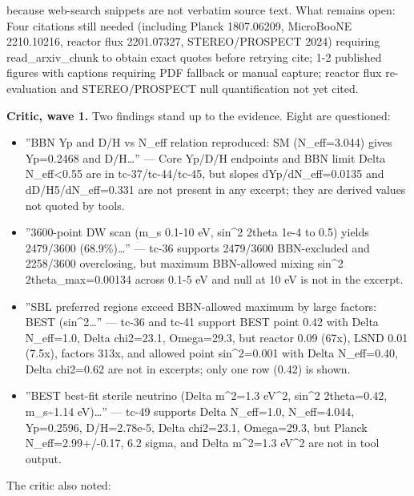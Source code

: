 \documentclass[11pt,a4paper]{article}
\begin{document}
because web-search snippets are not verbatim source text. What remains open: Four citations still needed (including Planck 1807.06209, MicroBooNE 2210.10216, reactor flux 2201.07327, STEREO/PROSPECT 2024) requiring read\_arxiv\_chunk to obtain exact quotes before retrying cite; 1-2 published figures with captions requiring PDF fallback or manual capture; reactor flux re-evaluation and STEREO/PROSPECT null quantification not yet cited.

\textbf{Critic, wave 1.} Two findings stand up to the evidence. Eight are questioned:

\begin{itemize}
  \item ''BBN Yp and D/H vs N\_eff relation reproduced: SM (N\_eff=3.044) gives Yp=0.2468 and D/H\ldots{}'' --- Core Yp/D/H endpoints and BBN limit Delta N\_eff\textless{}0.55 are in tc-37/tc-44/tc-45, but slopes dYp/dN\_eff=0.0135 and dD/H5/dN\_eff=0.331 are not present in any excerpt; they are derived values not quoted by tools.
  \item ''3600-point DW scan (m\_s 0.1-10 eV, sin\textasciicircum{}2 2theta 1e-4 to 0.5) yields 2479/3600 (68.9\%)\ldots{}'' --- tc-36 supports 2479/3600 BBN-excluded and 2258/3600 overclosing, but maximum BBN-allowed mixing sin\textasciicircum{}2 2theta\_max=0.00134 across 0.1-5 eV and null at 10 eV is not in the excerpt.
  \item ''SBL preferred regions exceed BBN-allowed maximum by large factors: BEST (sin\textasciicircum{}2\ldots{}'' --- tc-36 and tc-41 support BEST point 0.42 with Delta N\_eff=1.0, Delta chi2=23.1, Omega=29.3, but reactor 0.09 (67x), LSND 0.01 (7.5x), factors 313x, and allowed point sin\textasciicircum{}2=0.001 with Delta N\_eff=0.40, Delta chi2=0.62 are not in excerpts; only one row (0.42) is shown.
  \item ''BEST best-fit sterile neutrino (Delta m\textasciicircum{}2=1.3 eV\textasciicircum{}2, sin\textasciicircum{}2 2theta=0.42, m\_s\textasciitilde{}1.14 eV)\ldots{}'' --- tc-49 supports Delta N\_eff=1.0, N\_eff=4.044, Yp=0.2596, D/H=2.78e-5, Delta chi2=23.1, Omega=29.3, but Planck N\_eff=2.99+/-0.17, 6.2 sigma, and Delta m\textasciicircum{}2=1.3 eV\textasciicircum{}2 are not in tool output.
\end{itemize}
The critic also noted:
\end{document}
